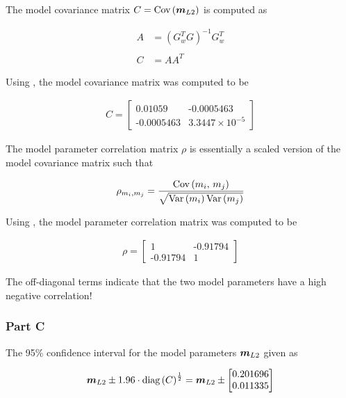 The model covariance matrix $C = \textrm{Cov}\left(\boldsymbol{m}_{L2}\right)$ is computed as

\begin{align*}
	A &= \left(G_w^T G \right)^{-1} G_w^T \\
	\\
	C &= A A^T
\end{align*}

Using \MATLAB, the model covariance matrix was computed to be

\begin{align*}
	C = \begin{bmatrix} \textrm{0.01059} & \textrm{-0.0005463} \\ \textrm{-0.0005463} & \textrm{3.3447} \times 10^{-5} \end{bmatrix}
\end{align*}

The model parameter correlation matrix $\rho$ is essentially a scaled version of the model covariance matrix such that

\begin{align*}
	\rho_{m_i,m_j} = \frac{\textrm{Cov}\left(m_i,\,m_j\right)}{\sqrt{\textrm{Var}\left(m_i\right)\textrm{Var}\left(m_j\right)}}
\end{align*}

Using \MATLAB, the model parameter correlation matrix was computed to be

\begin{align*}
	\rho = \begin{bmatrix} \textrm{1} & \textrm{-0.91794} \\ \textrm{-0.91794} & \textrm{1} \end{bmatrix}
\end{align*}

The off-diagonal terms indicate that the two model parameters have a high negative correlation!


\subsubsection{Part C}

The 95\% confidence interval for the model parameters $\boldsymbol{m}_{L2}$ given as 

\begin{align*}
	\boldsymbol{m}_{L2} \pm \textrm{1.96} \cdot \textrm{diag}\left(C\right)^\frac{1}{2} = \boldsymbol{m}_{L2} \pm \begin{bmatrix} \textrm{0.201696} \\ \textrm{0.011335} \end{bmatrix}
\end{align*}

